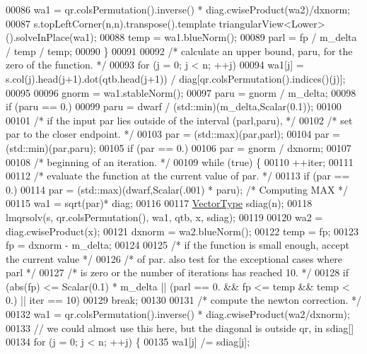 \begin{DoxyCode}
00086       wa1 = qr.colsPermutation().inverse() *  diag.cwiseProduct(wa2)/dxnorm;
00087       s.topLeftCorner(n,n).transpose().template triangularView<Lower>().solveInPlace(wa1);
00088       temp = wa1.blueNorm();
00089       parl = fp / m\_delta / temp / temp;
00090     \}
00091 
00092     \textcolor{comment}{/* calculate an upper bound, paru, for the zero of the function. */}
00093     \textcolor{keywordflow}{for} (j = 0; j < n; ++j)
00094       wa1[j] = s.col(j).head(j+1).dot(qtb.head(j+1)) / diag[qr.colsPermutation().indices()(j)];
00095 
00096     gnorm = wa1.stableNorm();
00097     paru = gnorm / m\_delta;
00098     \textcolor{keywordflow}{if} (paru == 0.)
00099       paru = dwarf / (std::min)(m\_delta,Scalar(0.1));
00100 
00101     \textcolor{comment}{/* if the input par lies outside of the interval (parl,paru), */}
00102     \textcolor{comment}{/* set par to the closer endpoint. */}
00103     par = (std::max)(par,parl);
00104     par = (std::min)(par,paru);
00105     \textcolor{keywordflow}{if} (par == 0.)
00106       par = gnorm / dxnorm;
00107 
00108     \textcolor{comment}{/* beginning of an iteration. */}
00109     \textcolor{keywordflow}{while} (\textcolor{keyword}{true}) \{
00110       ++iter;
00111 
00112       \textcolor{comment}{/* evaluate the function at the current value of par. */}
00113       \textcolor{keywordflow}{if} (par == 0.)
00114         par = (std::max)(dwarf,Scalar(.001) * paru); \textcolor{comment}{/* Computing MAX */}
00115       wa1 = sqrt(par)* diag;
00116 
00117       \hyperlink{struct_vector_type}{VectorType} sdiag(n);
00118       lmqrsolv(s, qr.colsPermutation(), wa1, qtb, x, sdiag);
00119 
00120       wa2 = diag.cwiseProduct(x);
00121       dxnorm = wa2.blueNorm();
00122       temp = fp;
00123       fp = dxnorm - m\_delta;
00124 
00125       \textcolor{comment}{/* if the function is small enough, accept the current value */}
00126       \textcolor{comment}{/* of par. also test for the exceptional cases where parl */}
00127       \textcolor{comment}{/* is zero or the number of iterations has reached 10. */}
00128       \textcolor{keywordflow}{if} (abs(fp) <= Scalar(0.1) * m\_delta || (parl == 0. && fp <= temp && temp < 0.) || iter == 10)
00129         \textcolor{keywordflow}{break};
00130 
00131       \textcolor{comment}{/* compute the newton correction. */}
00132       wa1 = qr.colsPermutation().inverse() * diag.cwiseProduct(wa2/dxnorm);
00133       \textcolor{comment}{// we could almost use this here, but the diagonal is outside qr, in sdiag[]}
00134       \textcolor{keywordflow}{for} (j = 0; j < n; ++j) \{
00135         wa1[j] /= sdiag[j];

\end{DoxyCode}

